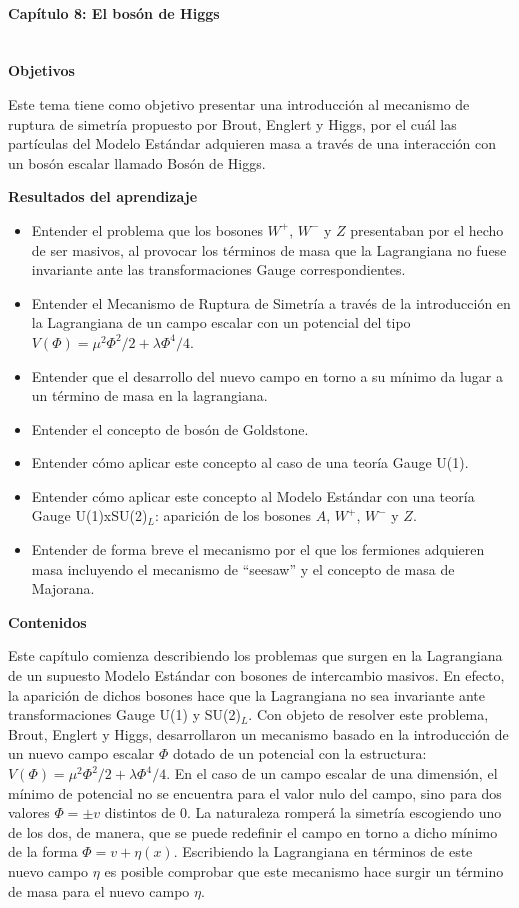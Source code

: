 \paragraph{Capítulo 8: El bosón de Higgs\\\\}\label{bosonhiggs}

\textbf{Objetivos}

Este tema tiene como objetivo presentar una introducción al mecanismo de ruptura de simetría propuesto por Brout, Englert y Higgs, por el cuál las partículas del Modelo Estándar adquieren masa a través de una interacción con un bosón escalar llamado Bosón de Higgs. 

\textbf{Resultados del aprendizaje}

\begin{itemize}
    \item Entender el problema que los bosones $W^{+}$, $W^{-}$ y $Z$ presentaban por el hecho de ser masivos, al provocar los términos de masa que la Lagrangiana no fuese invariante ante las transformaciones Gauge correspondientes.
    \item Entender el Mecanismo de Ruptura de Simetría a través de la introducción en la Lagrangiana de un campo escalar con un potencial del tipo $V(\Phi)=\mu^2\Phi^2/2 + \lambda\Phi^4/4$.
    \item Entender que el desarrollo del nuevo campo en torno a su mínimo da lugar a un término de masa en la lagrangiana.
    \item Entender el concepto de bosón de Goldstone.
    \item Entender cómo aplicar este concepto al caso de una teoría Gauge U(1).
    \item Entender cómo aplicar este concepto al Modelo Estándar con una teoría Gauge U(1)xSU(2)$_L$: aparición de los bosones $A$, $W^{+}$, $W^{-}$ y $Z$.
    \item Entender de forma breve el mecanismo por el que los fermiones adquieren masa incluyendo el mecanismo de ``seesaw'' y el concepto de masa de Majorana.
\end{itemize}

\textbf{Contenidos}

Este capítulo comienza describiendo los problemas que surgen en la Lagrangiana de un supuesto Modelo Estándar con bosones de intercambio masivos. En efecto, la aparición de dichos bosones hace que la Lagrangiana no sea invariante ante transformaciones Gauge U(1) y SU(2)$_L$. Con objeto de resolver este problema, Brout, Englert y Higgs, desarrollaron un mecanismo basado en la introducción de un nuevo campo escalar $\Phi$ dotado de un potencial con la estructura: $V(\Phi)=\mu^2\Phi^2/2 + \lambda\Phi^4/4$. En el caso de un campo escalar de una dimensión, el mínimo de potencial no se encuentra para el valor nulo del campo, sino para dos valores $\Phi = \pm v$ distintos de 0. La naturaleza romperá la simetría escogiendo uno de los dos, de manera, que se puede redefinir el campo en torno a dicho mínimo de la forma $\Phi = v + \eta(x)$. Escribiendo la Lagrangiana en términos de este nuevo campo $\eta$ es posible comprobar que este mecanismo hace surgir un término de masa para el nuevo campo $\eta$. 

